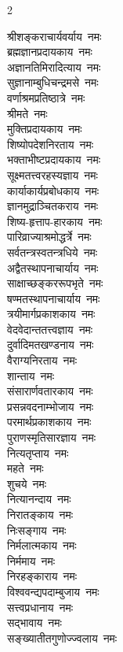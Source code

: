 \begin{multicols}{2}
    \begin{flushleft}
श्रीशङ्कराचार्यवर्याय~नमः\\
ब्रह्मज्ञानप्रदायकाय~नमः\\
अज्ञानतिमिरादित्याय~नमः\\
सुज्ञानाम्बुधिचन्द्रमसे~नमः\\
वर्णाश्रमप्रतिष्ठात्रे~नमः\\
श्रीमते~नमः\\
मुक्तिप्रदायकाय~नमः\\
शिष्योपदेशनिरताय~नमः\\
भक्ताभीष्टप्रदायकाय~नमः\\
सूक्ष्मतत्त्व\-रहस्यज्ञाय~नमः\hfill{}\\
                                        
कार्याकार्यप्रबोधकाय~नमः\\
ज्ञानमुद्राञ्चितकराय~नमः\\
शिष्य-हृत्ताप-हारकाय~नमः\\
पारिव्राज्याश्रमोद्धर्त्रे~नमः\\
सर्वतन्त्रस्वतन्त्रधिये~नमः\\
अद्वैतस्थापनाचार्याय~नमः\\
साक्षाच्छङ्कररूपभृते~नमः\\
षण्मतस्थापनाचार्याय~नमः\\
त्रयीमार्गप्रकाशकाय~नमः\\
वेदवेदान्ततत्त्वज्ञाय~नमः\hfill{}\\
                                        
दुर्वादिमतखण्डनाय~नमः\\
वैराग्यनिरताय~नमः\\
शान्ताय~नमः\\
संसारार्णवतारकाय~नमः\\
प्रसन्नवदनाम्भोजाय~नमः\\
परमार्थप्रकाशकाय~नमः\\
पुराणस्मृतिसारज्ञाय~नमः\\
नित्यतृप्ताय~नमः\\
महते~नमः\\
शुचये~नमः\hfill{}\\
                                        
नित्यानन्दाय~नमः\\
निरातङ्काय~नमः\\
निःसङ्गाय~नमः\\
निर्मलात्मकाय~नमः\\
निर्ममाय~नमः\\
निरहङ्काराय~नमः\\
विश्ववन्द्यपदाम्बुजाय~नमः\\
सत्त्वप्रधानाय~नमः\\
सद्भावाय~नमः\\
सङ्ख्यातीत\-गुणोज्ज्वलाय~नमः\hfill{}\\
                                        

\end{flushleft}
\end{multicols}
